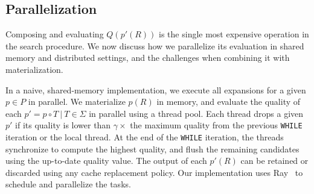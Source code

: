 








\subsection{Parallelization}\label{s:parallel}
Composing and evaluating $Q(p'(R))$ is the single most expensive operation in the search procedure.   We now discuss how we parallelize its evaluation in shared memory and distributed settings, and the challenges when combining it with materialization.

 In a naive, shared-memory implementation, we execute all expansions for a given $p\in P$ in parallel.  We materialize $p(R)$ in memory, and evaluate the quality of each $p' = p\circ T\ |\ T \in \Sigma$ in parallel using a  thread pool.  Each thread drops a given $p'$ if its quality is lower than $\gamma\times$ the maximum quality from the previous \texttt{WHILE} iteration or the local thread.  At the end of the \texttt{WHILE} iteration, the threads synchronize to compute the highest quality, and flush the remaining candidates using the up-to-date quality value.  The output of each $p'(R)$ can be retained or discarded using any cache replacement policy.  Our implementation uses Ray~\cite{ray} to schedule and parallelize the tasks.

 


